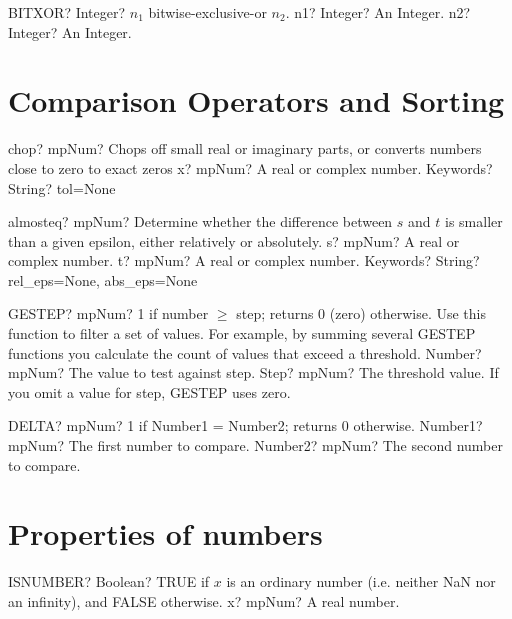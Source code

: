 \documentclass[12pt,a4paper,openany]{book}
\begin{document}
\begin{mpFunctionsExtract}
\mpWorksheetFunctionTwoNotImplemented
{BITXOR? Integer? $n_1$ bitwise-exclusive-or $n_2$.}
{n1? Integer? An Integer.}
{n2? Integer? An Integer.}
\end{mpFunctionsExtract}

\section{Comparison Operators and Sorting}

\begin{mpFunctionsExtract}
\mpFunctionTwo
{chop? mpNum? Chops off small real or imaginary parts, or converts numbers close to zero to exact zeros}
{x? mpNum? A real or complex number.}
{Keywords? String? tol=None}
\end{mpFunctionsExtract}

\begin{mpFunctionsExtract}
\mpFunctionThree
{almosteq? mpNum? Determine whether the difference between $s$ and $t$ is smaller than a given epsilon, either relatively or absolutely.}
{s? mpNum? A real or complex number.}
{t? mpNum? A real or complex number.}
{Keywords? String? rel\_eps=None, abs\_eps=None}
\end{mpFunctionsExtract}

\begin{mpFunctionsExtract}
\mpWorksheetFunctionTwoNotImplemented
{GESTEP? mpNum?  1 if number $\geq$ step; returns 0 (zero) otherwise. Use this function to filter a set of values. For example, by summing several GESTEP functions you calculate the count of values that exceed a threshold.}
{Number? mpNum? The value to test against step.}
{Step? mpNum? The threshold value. If you omit a value for step, GESTEP uses zero.}
\end{mpFunctionsExtract}

\begin{mpFunctionsExtract}
\mpWorksheetFunctionTwoNotImplemented
{DELTA? mpNum?  1 if Number1 = Number2; returns 0 otherwise.}
{Number1? mpNum? The first number to compare.}
{Number2? mpNum? The second number to compare.}
\end{mpFunctionsExtract}

\section{Properties of numbers}

\begin{mpFunctionsExtract}
\mpWorksheetFunctionOneNotImplemented
{ISNUMBER? Boolean? TRUE if $x$ is an ordinary number (i.e. neither NaN nor an infinity), and FALSE otherwise.}
{x? mpNum? A real number.}
\end{mpFunctionsExtract}
\end{document}

